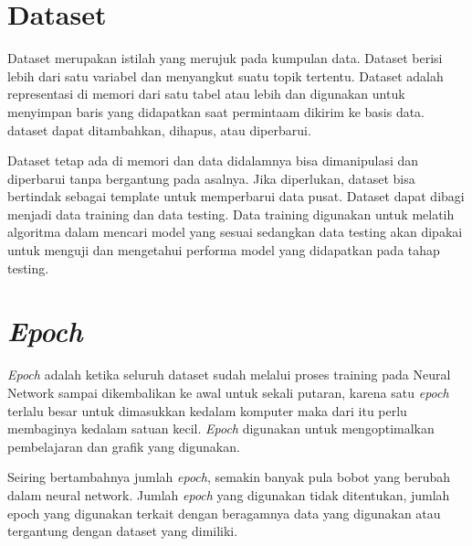 \section{Dataset}
Dataset merupakan istilah yang merujuk pada kumpulan data. Dataset berisi lebih dari satu variabel dan menyangkut suatu topik tertentu. Dataset adalah representasi di memori dari satu tabel atau lebih dan digunakan untuk menyimpan baris yang didapatkan saat permintaam dikirim ke basis data. dataset dapat ditambahkan, dihapus, atau diperbarui.

Dataset tetap ada di memori dan data didalamnya bisa dimanipulasi dan diperbarui tanpa bergantung pada asalnya. Jika diperlukan, dataset bisa bertindak sebagai template untuk memperbarui data pusat. Dataset dapat dibagi menjadi data training dan data testing. Data training digunakan untuk melatih algoritma dalam mencari model yang sesuai sedangkan data testing akan dipakai untuk menguji dan mengetahui performa model yang didapatkan pada tahap testing.

\section{\textit{Epoch}}
\textit{Epoch} adalah ketika seluruh dataset sudah melalui proses training pada Neural Network sampai dikembalikan ke awal untuk sekali putaran, karena satu \textit{epoch} terlalu besar untuk dimasukkan kedalam komputer maka dari itu perlu membaginya kedalam satuan kecil. \textit{Epoch} digunakan untuk mengoptimalkan pembelajaran dan grafik yang digunakan.

Seiring bertambahnya jumlah \textit{epoch}, semakin banyak pula bobot yang berubah dalam neural network. Jumlah \textit{epoch} yang digunakan tidak ditentukan, jumlah epoch yang digunakan terkait dengan beragamnya data yang digunakan atau tergantung dengan dataset yang dimiliki.

